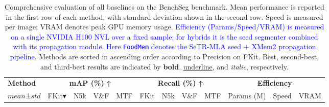 \documentclass[preprint,12pt]{elsarticle}
\newcommand{\change}[1]{\textcolor{blue}{#1}}
\begin{document}
\begin{table}[!htbp]
\centering
\scriptsize
\setlength{\tabcolsep}{3pt}
\caption{Comprehensive evaluation of all baselines on the BenchSeg benchmark.
Mean performance is reported in the first row of each method, with standard deviation shown in the second row.
Speed is measured per image; VRAM denotes peak GPU memory usage. \change{Efficiency (Params/Speed/VRAM) is measured on a single NVIDIA H100 NVL over a fixed sample; for hybrids it is the seed segmenter combined with its propagation module. Here \texttt{FoodMem} denotes the SeTR-MLA seed $+$ XMem2 propagation pipeline.} Methods are sorted in ascending order according to Precision on FKit. Best, second-best, and third-best results are indicated by \textbf{bold}, \underline{underline}, and \textit{italic}, respectively.}
\label{tab:results}

\begin{tabular}{lccccccccccc}
\toprule
\textbf{Method} &
\multicolumn{4}{c}{\textbf{mAP (\%) ↑}} &
\multicolumn{4}{c}{\textbf{Recall (\%) ↑}} &
\multicolumn{3}{c}{\textbf{Efficiency }} \\
\cmidrule(lr){2-5} \cmidrule(lr){6-9} \cmidrule(lr){10-12}
$mean$±$std$ & FKit$\blacktriangledown$ & N5k & V\&F & MTF
 & FKit & N5k & V\&F & MTF
 & Params (M) & Speed & VRAM \\
\midrule


\end{tabular}
\end{table}
\end{document}
